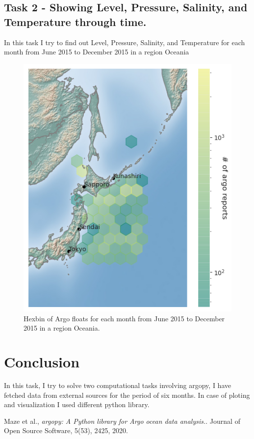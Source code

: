 \documentclass[12pt]{article}
\begin{document}
\subsection{Task 2 - Showing Level, Pressure, Salinity, and Temperature through time.}

In this task I try to find out Level, Pressure, Salinity, and Temperature for each month from June 2015 to December 2015  in a region Oceania

\begin{figure}[H]
\includegraphics[width=\textwidth,height=\textheight,keepaspectratio]{locations.png}
\caption{Hexbin of Argo floats for each month from June 2015 to December 2015  in a region Oceania.}
\label{fig:task 2}
 
\end{figure}

\section{Conclusion}
In this task, I try to solve two computational tasks involving argopy, I have fetched data from external sources for the period of six months. In case of ploting and visualization I used different python library.


\begin{thebibliography}{9}
    Maze et al.,
    \textit{argopy: A Python library for Argo ocean data analysis.}. 
    Journal of Open Source Software, 5(53), 2425, 2020.
\end{thebibliography}
\end{document}
